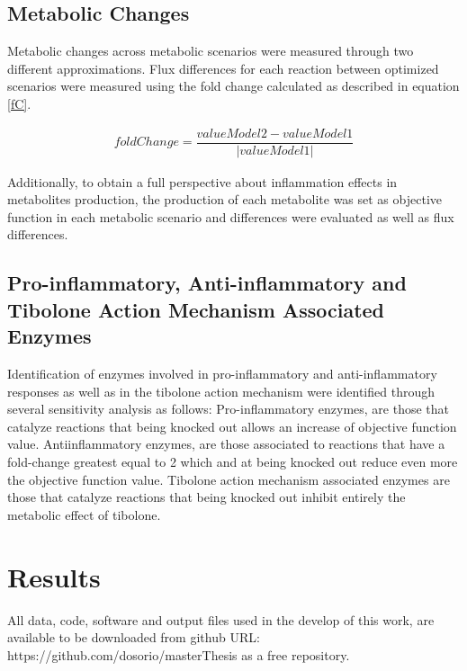 \subsection*{Metabolic Changes}
Metabolic changes across metabolic scenarios were measured through two different approximations. Flux differences for each reaction between optimized scenarios were measured using the fold change calculated as described in equation \ref{fC}.
\begin{ceqn}
\begin{align}
\label{fC}
   foldChange = \dfrac{valueModel2-valueModel1}{\left|valueModel1\right|}
\end{align}
\end{ceqn}
Additionally, to obtain a full perspective about inflammation effects in metabolites production, the production of each metabolite was set as objective function in each metabolic scenario and differences were evaluated as well as flux differences.
\subsection*{Pro-inflammatory, Anti-inflammatory and Tibolone Action Mechanism Associated Enzymes}
Identification of enzymes involved in pro-inflammatory and anti-inflammatory responses as well as in the tibolone action mechanism were identified through several sensitivity analysis as follows: Pro-inflammatory enzymes, are those that catalyze reactions that being knocked out allows an increase of objective function value. Antiinflammatory enzymes, are those associated to reactions that have a fold-change greatest equal to 2 which and at being knocked out reduce even more the objective function value. Tibolone action mechanism associated enzymes are those that catalyze reactions that being knocked out inhibit entirely the metabolic effect of tibolone.

\section{Results}
All data, code, software and output files used in the develop of this work, are available to be downloaded from github URL: https://github.com/dosorio/masterThesis as a free repository.

